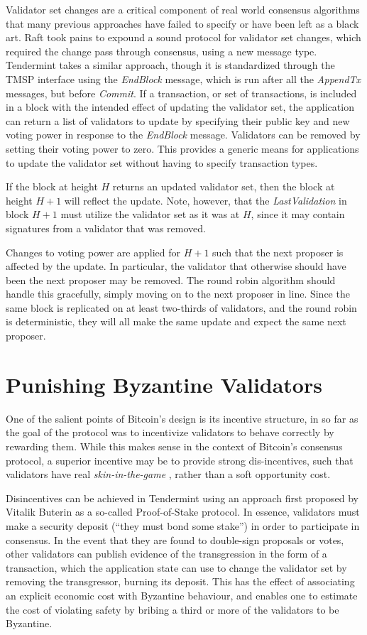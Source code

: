 Validator set changes are a critical component of real world consensus algorithms that many previous approaches have failed to specify 
or have been left as a black art. 
Raft took pains to expound a sound protocol for validator set changes, which required the change pass through consensus, 
using a new message type.
Tendermint takes a similar approach, though it is standardized through the TMSP interface using the \emph{EndBlock} message,
which is run after all the \emph{AppendTx} messages, but before \emph{Commit}.
If a transaction, or set of transactions, is included in a block with the intended effect of updating the validator set,
the application can return a list of validators to update by specifying their public key and new voting power 
in response to the \emph{EndBlock} message.
Validators can be removed by setting their voting power to zero.
This provides a generic means for applications to update the validator set without having to specify transaction types.

If the block at height $H$ returns an updated validator set, 
then the block at height $H+1$ will reflect the update.
Note, however, that the \emph{LastValidation} in block $H+1$
must utilize the validator set as it was at $H$, 
since it may contain signatures from a validator that was removed.

Changes to voting power are applied for $H+1$ such that the next proposer 
is affected by the update. 
In particular, the validator that otherwise should have been the next proposer may be removed.
The round robin algorithm should handle this gracefully, simply moving on to the next proposer in line.
Since the same block is replicated on at least two-thirds of validators, 
and the round robin is deterministic,
they will all make the same update and expect the same next proposer.

\section{Punishing Byzantine Validators}

One of the salient points of Bitcoin's design is its incentive structure, 
in so far as the goal of the protocol was to incentivize validators to behave correctly
by rewarding them. While this makes sense in the context of Bitcoin's consensus protocol,
a superior incentive may be to provide strong dis-incentives, such that validators
have real \emph{skin-in-the-game} \cite{taleb2014skin}, rather than a soft opportunity cost.

Disincentives can be achieved in Tendermint using an approach first proposed by Vitalik Buterin \cite{slasher} as a so-called Proof-of-Stake protocol.
In essence, validators must make a security deposit (``they must bond some stake'')
in order to participate in consensus.
In the event that they are found to double-sign proposals or votes, 
other validators can publish evidence of the transgression in the form of a transaction, 
which the application state can use to change the validator set by removing the transgressor, burning its deposit.
This has the effect of associating an explicit economic cost with Byzantine behaviour, 
and enables one to estimate the cost of violating safety by bribing a third or more of the validators to be Byzantine.

